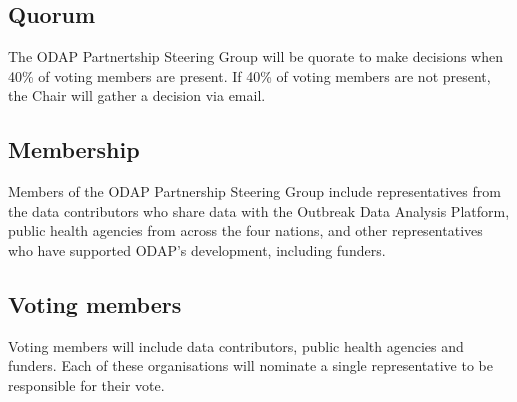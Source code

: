 \documentclass[
]{article}
\begin{document}
\hypertarget{quorum}{%
\subsection{Quorum}\label{quorum}}

The ODAP Partnertship Steering Group will be quorate to make decisions
when 40\% of voting members are present. If 40\% of voting members are
not present, the Chair will gather a decision via email.

\hypertarget{membership}{%
\subsection{Membership}\label{membership}}

Members of the ODAP Partnership Steering Group include representatives
from the data contributors who share data with the Outbreak Data
Analysis Platform, public health agencies from across the four nations,
and other representatives who have supported ODAP's development,
including funders.

\hypertarget{voting-members}{%
\subsection{Voting members}\label{voting-members}}

Voting members will include data contributors, public health agencies
and funders. Each of these organisations will nominate a single
representative to be responsible for their vote.
\end{document}
